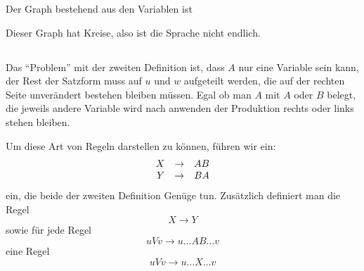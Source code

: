 \documentclass{article}
\begin{document}
Der Graph bestehend aus den Variablen ist
\begin{center}
\end{center}
Dieser Graph hat Kreise, also ist die Sprache nicht endlich.

\subsection{} 

Das ``Problem'' mit der zweiten Definition ist, dass $A$ nur eine Variable sein
kann, der Rest der Satzform muss auf $u$ und $w$ aufgeteilt werden, die auf der
rechten Seite unverändert bestehen bleiben müssen. Egal ob man $A$ mit $A$ oder
$B$ belegt, die jeweils andere Variable wird nach anwenden der Produktion
rechts oder links stehen bleiben.

Um diese Art von Regeln darstellen zu können, führen wir ein:
\begin{equation*}
   \begin{array}{rcl}
      X & \rightarrow & AB \\
      Y & \rightarrow & BA
   \end{array}
\end{equation*}
ein, die beide der zweiten Definition Genüge tun. Zusätzlich definiert man die
Regel
\begin{equation*}
   X\rightarrow Y
\end{equation*}
sowie für jede Regel
\begin{equation*}
   uVv \rightarrow u\ldots AB \ldots v
\end{equation*}
eine Regel
\begin{equation*}
   uVv \rightarrow u\ldots X \ldots v
\end{equation*}
\end{document}
